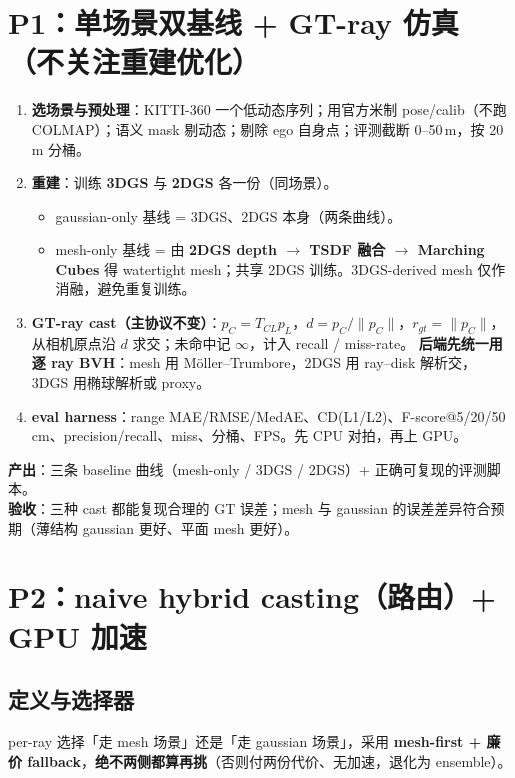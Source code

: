 \documentclass[10pt,a4paper]{article}
\begin{document}
\section{P1：单场景双基线 + GT-ray 仿真（不关注重建优化）}

\begin{enumerate}[leftmargin=1.4em,itemsep=1pt,topsep=1pt]
\item \textbf{选场景与预处理}：KITTI-360 一个低动态序列；用官方米制 pose/calib（不跑 COLMAP）；语义 mask 剔动态；剔除 ego 自身点；评测截断 0--50\,m，按 20\,m 分桶。
\item \textbf{重建}：训练 \textbf{3DGS} 与 \textbf{2DGS} 各一份（同场景）。
  \begin{itemize}
  \item gaussian-only 基线 = 3DGS、2DGS 本身（两条曲线）。
  \item mesh-only 基线 = 由 \textbf{2DGS depth $\rightarrow$ TSDF 融合 $\rightarrow$ Marching Cubes} 得 watertight mesh；共享 2DGS 训练。3DGS-derived mesh 仅作消融，避免重复训练。
  \end{itemize}
\item \textbf{GT-ray cast（主协议不变）}：$p_C=T_{CL}p_L$，$d=p_C/\|p_C\|$，$r_{gt}=\|p_C\|$，从相机原点沿 $d$ 求交；未命中记 $\infty$，计入 recall / miss-rate。
  \textbf{后端先统一用逐 ray BVH}：mesh 用 Möller--Trumbore，2DGS 用 ray--disk 解析交，3DGS 用椭球解析或 proxy。
\item \textbf{eval harness}：range MAE/RMSE/MedAE、CD(L1/L2)、F-score@5/20/50\,cm、precision/recall、miss、分桶、FPS。先 CPU 对拍，再上 GPU。
\end{enumerate}

\textbf{产出}：三条 baseline 曲线（mesh-only / 3DGS / 2DGS）+ 正确可复现的评测脚本。\\
\textbf{验收}：三种 cast 都能复现合理的 GT 误差；mesh 与 gaussian 的误差差异符合预期（薄结构 gaussian 更好、平面 mesh 更好）。

\section{P2：naive hybrid casting（路由）+ GPU 加速}

\subsection{定义与选择器}
per-ray 选择「走 mesh 场景」还是「走 gaussian 场景」，采用 \textbf{mesh-first + 廉价 fallback}，\textbf{绝不两侧都算再挑}（否则付两份代价、无加速，退化为 ensemble）。
\end{document}
